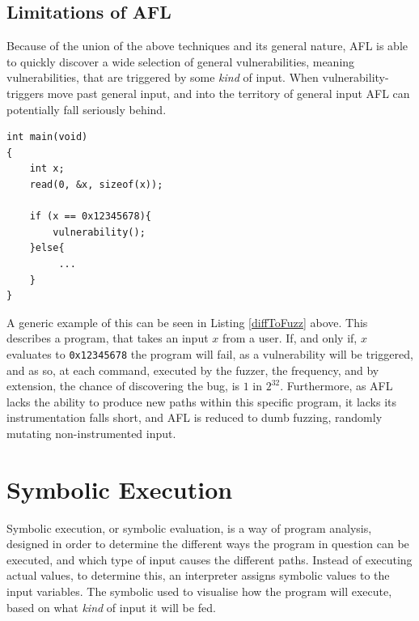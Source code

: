 \documentclass[a4paper]{article}
\newcommand{\tit}[1]{\textit{#1}}
\newcommand{\ttt}[1]{\texttt{#1}}
\begin{document}
\subsection{Limitations of AFL}
\label{sec:LimitsAFL}
Because of the union of the above techniques and its general nature, AFL is able to quickly discover a wide selection of general vulnerabilities, meaning vulnerabilities, that are triggered by some \tit{kind} of input. When vulnerability-triggers move past general input, and into the territory of general input AFL can potentially fall seriously behind.
\begin{lstlisting}[caption=A program that is difficult to fuzz, label=diffToFuzz, captionpos=b]
int main(void)
{
    int x;
    read(0, &x, sizeof(x));
    
    if (x == 0x12345678){
        vulnerability();
    }else{
         ...
    }
}
\end{lstlisting}
A generic example of this can be seen in Listing \ref{diffToFuzz} above. This describes a program, that takes an input $x$ from a user. If, and only if, $x$ evaluates to \ttt{0x12345678} the program will fail, as a vulnerability will be triggered, and as so, at each command, executed by the fuzzer, the frequency, and by extension, the chance of discovering the bug, is $1$ in $2^{32}$. Furthermore, as AFL lacks the ability to produce new paths within this specific program, it lacks its instrumentation falls short, and AFL is reduced to dumb fuzzing, randomly mutating non-instrumented input.
\newpage
\section{Symbolic Execution}
\label{sec:SymEx}
Symbolic execution, or symbolic evaluation, is a way of program analysis, designed in order to determine the different ways the program in question can be executed, and which type of input causes the different paths. Instead of executing actual values, to determine this, an interpreter assigns symbolic values to the input variables. The symbolic used to visualise how the program will execute, based on what \tit{kind} of input it will be fed.
\end{document}

